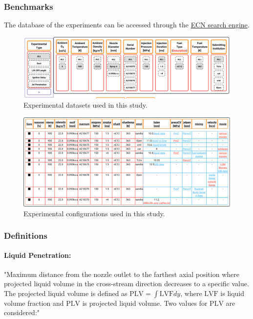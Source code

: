 \subsubsection*{Benchmarks}
The database of the experiments can be accessed through the \href{https://ecn.sandia.gov/ecn-data-search/}{ECN search engine}.

\begin{figure}[H]
    \centering
    \includegraphics[width=0.9\linewidth]{figs/MB18/experiment-search-criteria.png}
    \caption{Experimental datasets used in this study.}
    \label{fig:enter-label}
\end{figure}

\begin{figure}[H]
    \centering
    \includegraphics[width=0.9\linewidth]{figs/MB18/experiment-search-output.png}
    \caption{Experimental configurations used in this study.}
    \label{fig:enter-label}
\end{figure}

\subsubsection*{Definitions}
\paragraph{Liquid Penetration:} 
"Maximum distance from the nozzle outlet to the farthest axial position where projected liquid volume in the cross-stream direction decreases to a specific value. The projected liquid volume is defined as $\mathrm{PLV} = \int \mathrm{LVF} dy$, where $\mathrm{LVF}$ is liquid volume fraction and $\mathrm{PLV}$ is projected liquid volume. Two values for $\mathrm{PLV}$ are considered:" \cite{ref6}

